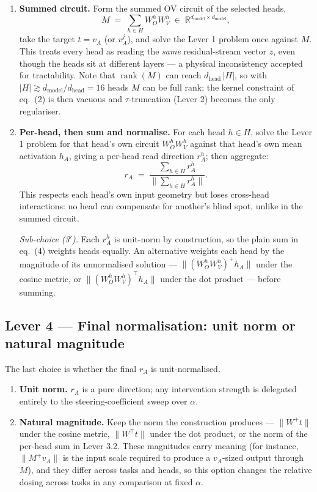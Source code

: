 \documentclass[
]{article}
\newcommand{\dmodel}{d_{\mathrm{model}}}
\newcommand{\dhead}{d_{\mathrm{head}}}
\begin{document}
\begin{enumerate}
\item
  \textbf{Summed circuit.} Form the summed OV circuit of the selected heads,
  \begin{equation}
  M \;=\; \sum_{h \in H} W^h_O W^h_V \;\in\; \mathbb{R}^{\dmodel \times \dmodel},
  \tag{3}
  \end{equation}
  take the target $t = v_A$ (or $v^j_A$), and solve the Lever 1 problem once against
  $M$. This treats every head as reading the \emph{same} residual-stream vector $z$,
  even though the heads sit at different layers --- a physical inconsistency accepted
  for tractability. Note that $\operatorname{rank}(M)$ can reach $\dhead\,|H|$, so with
  $|H| \gtrsim \dmodel/\dhead = 16$ heads $M$ can be full rank; the kernel constraint
  of eq.~(2) is then vacuous and $\tau$-truncation (Lever 2) becomes the only
  regulariser.
\item
  \textbf{Per-head, then sum and normalise.} For each head $h \in H$, solve the Lever 1
  problem for that head's own circuit $W^h_O W^h_V$ against that head's own mean
  activation $h_A$, giving a per-head read direction $r^h_A$; then aggregate:
  \begin{equation}
  r_A \;=\; \frac{\sum_{h \in H} r^h_A}{\bigl\|\sum_{h \in H} r^h_A\bigr\|}. \tag{4}
  \end{equation}
  This respects each head's own input geometry but loses cross-head interactions: no
  head can compensate for another's blind spot, unlike in the summed circuit.

  \emph{Sub-choice (3$'$).} Each $r^h_A$ is unit-norm by construction, so the plain sum
  in eq.~(4) weights heads equally. An alternative weights each head by the magnitude
  of its unnormalised solution --- $\|(W^h_O W^h_V)^{+} h_A\|$ under the cosine metric,
  or $\|(W^h_O W^h_V)^{\top} h_A\|$ under the dot product --- before summing.
\end{enumerate}

\subsection{Lever 4 — Final normalisation: unit norm or natural
magnitude}\label{lever-4-normalisation}

The last choice is whether the final $r_A$ is unit-normalised.

\begin{enumerate}
\item
  \textbf{Unit norm.} $r_A$ is a pure direction; any intervention strength is delegated
  entirely to the steering-coefficient sweep over $\alpha$.
\item
  \textbf{Natural magnitude.} Keep the norm the construction produces ---
  $\|W^{+} t\|$ under the cosine metric, $\|W^{\top} t\|$ under the dot product, or the
  norm of the per-head sum in Lever 3.2. These magnitudes carry meaning (for instance,
  $\|M^{+} v_A\|$ is the input scale required to produce a $v_A$-sized output through
  $M$), and they differ across tasks and heads, so this option changes the relative
  dosing across tasks in any comparison at fixed $\alpha$.
\end{enumerate}
\end{document}
